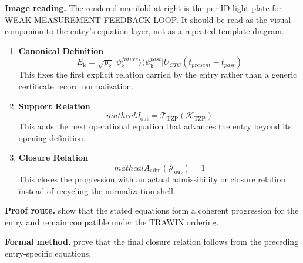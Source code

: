 \begin{samepage}
\noindent\begin{minipage}[t]{0.45\linewidth}
\vspace{0pt}
\raggedright
\scriptsize\textbf{Image reading.} The rendered manifold at right is the per-ID light plate for WEAK MEASUREMENT FEEDBACK LOOP. It should be read as the visual companion to the entry's equation layer, not as a repeated template diagram.\par
\end{minipage}\hfill
\begin{minipage}[t]{0.53\linewidth}
\vspace*{-0.10in}
\raggedright
{}
\end{minipage}
\end{samepage}

\clearpage


\begin{enumerate}[leftmargin=1.6em,itemsep=9pt,topsep=6pt]
\item \textbf{Canonical Definition}
\[
E_{\mathrm{k}} = \sqrt{p_{\mathrm{k}}} \lvert \psi_{\mathrm{k}}^{future} \rangle \langle \psi_{\mathrm{k}}^{past}| U_{CTC}(t_{present} - t_{past})
\]
This fixes the first explicit relation carried by the entry rather than a generic certificate record normalization.

\item \textbf{Support Relation}
\[
mathcal{J}_{\mathrm{out}} = \mathcal{T}_{\mathrm{TZP}}\!\left(\mathcal{K}_{\mathrm{TZP}}\right)
\]
This adds the next operational equation that advances the entry beyond its opening definition.

\item \textbf{Closure Relation}
\[
mathcal{A}_{\mathrm{adm}}\!\left(\mathcal{J}_{\mathrm{out}}\right)=1
\]
This closes the progression with an actual admissibility or closure relation instead of recycling the normalization shell.
\end{enumerate}

\textbf{Proof route.} show that the stated equations form a coherent progression for the entry and remain compatible under the TRAWIN ordering.

\textbf{Formal method.} prove that the final closure relation follows from the preceding entry-specific equations.

